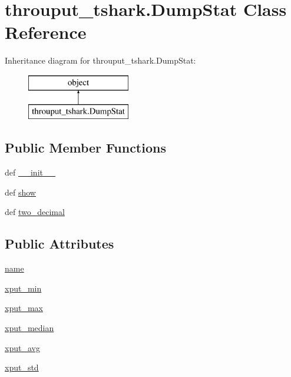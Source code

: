 \hypertarget{classthrouput__tshark_1_1_dump_stat}{\section{throuput\-\_\-tshark.\-Dump\-Stat Class Reference}
\label{classthrouput__tshark_1_1_dump_stat}
}
Inheritance diagram for throuput\-\_\-tshark.\-Dump\-Stat\-:\begin{figure}[H]
\begin{center}
\leavevmode
\includegraphics[height=2.000000cm]{classthrouput__tshark_1_1_dump_stat}
\end{center}
\end{figure}
\subsection*{Public Member Functions}
\begin{DoxyCompactItemize}
\item 
def \hyperlink{classthrouput__tshark_1_1_dump_stat_a0d29689f383bac8dd525a3ed23c74d00}{\-\_\-\-\_\-init\-\_\-\-\_\-}
\item 
def \hyperlink{classthrouput__tshark_1_1_dump_stat_ac45218a7a6a5441f2c4df7271762697a}{show}
\item 
def \hyperlink{classthrouput__tshark_1_1_dump_stat_a6641d527896c116977d19a27e84db04e}{two\-\_\-decimal}
\end{DoxyCompactItemize}
\subsection*{Public Attributes}
\begin{DoxyCompactItemize}
\item 
\hyperlink{classthrouput__tshark_1_1_dump_stat_a1c4c3a2c6b7d0567fafafc8ed99b9234}{name}
\item 
\hyperlink{classthrouput__tshark_1_1_dump_stat_a353c7d18a6ab1cf675fe48414db842f6}{xput\-\_\-min}
\item 
\hyperlink{classthrouput__tshark_1_1_dump_stat_a56277a45da1cc668c2ca475c9c79252f}{xput\-\_\-max}
\item 
\hyperlink{classthrouput__tshark_1_1_dump_stat_a98015d7e601bc2e9ecc1767b4161d839}{xput\-\_\-median}
\item 
\hyperlink{classthrouput__tshark_1_1_dump_stat_a3ae9048e24981b32848e528cb824ef35}{xput\-\_\-avg}
\item 
\hyperlink{classthrouput__tshark_1_1_dump_stat_a922df400ee818a42eb25ef21d8746241}{xput\-\_\-std}
\end{DoxyCompactItemize}


